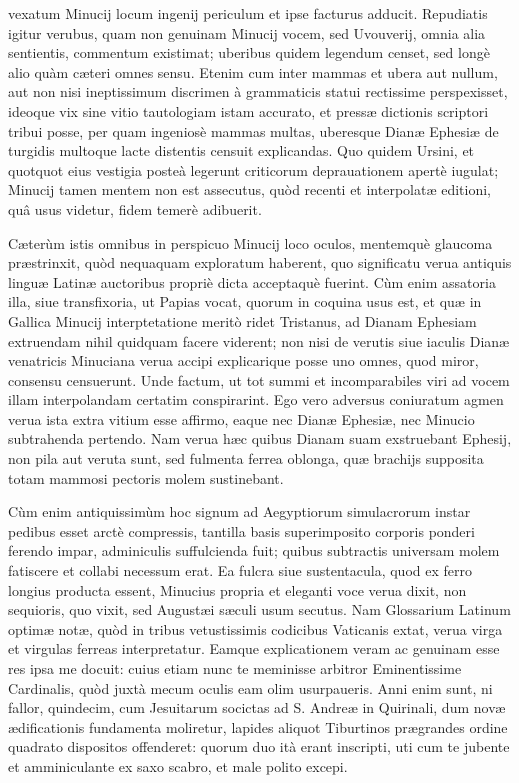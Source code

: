 \documentclass[a4paper, 11pt, oneside, polutonikogreek, latin]{article}
\begin{document}
vexatum Minucij locum ingenij periculum et ipse facturus adducit. Repudiatis igitur verubus, quam non genuinam Minucij vocem, sed Uvouverij, omnia alia sentientis, commentum existimat; uberibus quidem legendum censet, sed longè alio quàm cæteri omnes sensu. Etenim cum inter mammas et ubera aut nullum, aut non nisi ineptissimum discrimen à grammaticis statui rectissime perspexisset, ideoque vix sine vitio tautologiam istam accurato, et pressæ dictionis scriptori tribui posse, per quam ingeniosè mammas multas, uberesque Dianæ Ephesiæ de turgidis multoque lacte distentis censuit explicandas. Quo quidem Ursini, et quotquot eius vestigia posteà legerunt criticorum deprauationem apertè iugulat; Minucij tamen mentem non est assecutus, quòd recenti et interpolatæ editioni, quâ usus videtur, fidem temerè adibuerit.

Cæterùm istis omnibus in perspicuo Minucij loco oculos, mentemquè glaucoma præstrinxit, quòd nequaquam exploratum haberent, quo significatu verua antiquis linguæ Latinæ auctoribus propriè dicta acceptaquè fuerint. Cùm enim assatoria illa, siue transfixoria, ut Papias vocat, quorum in coquina usus est, et quæ in Gallica Minucij interptetatione meritò ridet Tristanus, ad Dianam Ephesiam extruendam nihil quidquam facere viderent; non nisi de verutis siue iaculis Dianæ venatricis Minuciana verua accipi explicarique posse uno omnes, quod miror, consensu censuerunt. Unde factum, ut tot summi et incomparabiles viri ad vocem illam interpolandam certatim conspirarint. Ego vero adversus coniuratum agmen verua ista extra vitium esse affirmo, eaque nec Dianæ Ephesiæ, nec Minucio subtrahenda pertendo. Nam verua hæc quibus Dianam suam exstruebant Ephesij, non pila aut veruta sunt, sed fulmenta ferrea oblonga, quæ brachijs supposita totam mammosi pectoris molem sustinebant.

Cùm enim antiquissimùm hoc signum ad Aegyptiorum simulacrorum instar pedibus esset arctè compressis, tantilla basis superimposito corporis ponderi ferendo impar, adminiculis suffulcienda fuit; quibus subtractis universam molem fatiscere et collabi necessum erat. Ea fulcra siue sustentacula, quod ex ferro longius producta essent, Minucius propria et eleganti voce verua dixit, non sequioris, quo vixit, sed Augustæi sæculi usum secutus. Nam Glossarium Latinum optimæ notæ, quòd in tribus vetustissimis codicibus Vaticanis extat, verua virga et virgulas ferreas interpretatur. Eamque explicationem veram ac genuinam esse res ipsa me docuit: cuius etiam nunc te meminisse arbitror Eminentissime Cardinalis, quòd juxtà mecum oculis eam olim usurpaueris. Anni enim sunt, ni fallor, quindecim, cum Jesuitarum socictas ad S. Andreæ in Quirinali, dum novæ ædificationis fundamenta moliretur, lapides aliquot Tiburtinos prægrandes ordine quadrato dispositos offenderet: quorum duo ità erant inscripti, uti cum te jubente et amminiculante ex saxo scabro, et male polito excepi.
\end{document}
